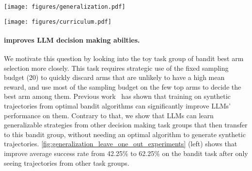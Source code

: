\begin{figure*}[h]
    \centering
    \texttt{[image: figures/generalization.pdf]}
    \vspace{-0.2cm}
    \caption{\footnotesize \textbf{(Testing generalization of \ours{} via leave-one-out experiments)} We test \ours{}'s zero-shot performance on unseen task groups by leave-one-out (LOO) experiments, where we train the LLM on trajectories from every task group except the group we test on. All evaluations are done at temperature 0.7 and we report average success rate. Our experiments demonstrate that \ours{} can teach an LLM sequential decision making abilities that often transfers well to new tasks without needing any additional training.}
    \label{fig:generalization_leave_one_out_experiments}
    \vspace{-0.2cm}
\end{figure*}

\begin{figure*}[h]
    \centering
    \texttt{[image: figures/curriculum.pdf]}
    \vspace{-0.3cm}
    \caption{\footnotesize \textbf{(Multi-round training with curriculum on twenty questions)} We demonstrate the efficacy of our curriculum learning algorithm for sampling training tasks by comparing its performance against uniform sampling for multi-round training. All evaluations are done at temperature 0.7, and shaded regions represent standard error over 3 seeds. (\textbf{Left}) Average success rate at each round. (\textbf{Middle}) Pass@4 success rate at each round. (\textbf{Right}) Success rate per each of easy, medium, and hard task groups. Overall, our curriculum learning algorithm shows 1.4\% and 3.3\% improvement over the uniform sampling baseline at average and pass@4 success rate respectively.}
    \label{fig:curriculum}
    \vspace{-0.35cm}
\end{figure*}


\paragraph{\ours{} improves LLM decision making abilties.}

We motivate this question by looking into the toy task group of bandit best arm selection more closely. This task requires strategic use of the fixed sampling budget (20) to quickly discard arms that are unlikely to have a high mean reward, and use most of the sampling budget on the few top arms to decide the best arm among them. Previous work~\citep{nie2024evolveevaluatingoptimizingllms} has shown that training on synthetic trajectories from optimal bandit algorithms can significantly improve LLMs' performance on them. Contrary to that, we show that LLMs can learn generalizable strategies from other decision making task groups that then transfer to this bandit group, without needing an optimal algorithm to generate synthetic trajectories. \cref{fig:generalization_leave_one_out_experiments} (left) shows that \ours{} improve average success rate from 42.25\% to 62.25\% on the bandit task after only seeing trajectories from other task groups.

